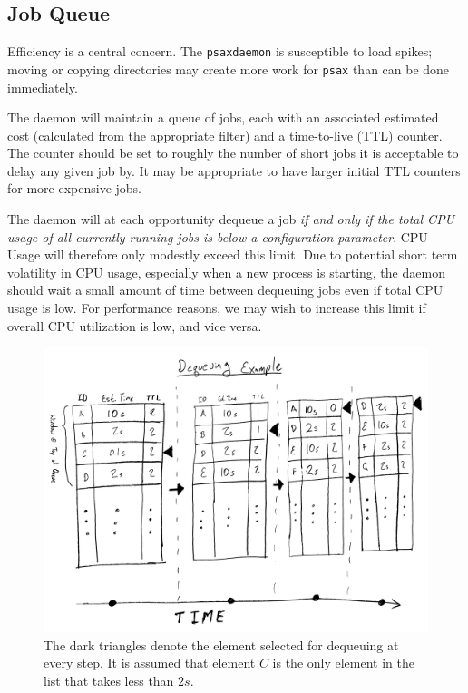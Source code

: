 \documentclass[a4paper]{report}
\newcommand{\inlinecode}{\texttt}
\begin{document}
\subsection{Job Queue}

Efficiency is a central concern. The \inlinecode{psaxdaemon} is susceptible to load spikes; moving or copying directories may create more work for \inlinecode{psax} than can be done immediately.

The daemon will maintain a queue of jobs, each with an associated estimated cost (calculated from the appropriate filter) and a time-to-live (TTL) counter. The counter should be set to roughly the number of short jobs it is acceptable to delay any given job by. It may be appropriate to have larger initial TTL counters for more expensive jobs.

The daemon will at each opportunity dequeue a job \emph{if and only if the total CPU usage of all currently running jobs is below a configuration parameter}. CPU Usage will therefore only modestly exceed this limit. Due to potential short term volatility in CPU usage, especially when a new process is starting, the daemon should wait a small amount of time between dequeuing jobs even if total CPU usage is low. For performance reasons, we may wish to increase this limit if overall CPU utilization is low, and vice versa.

\begin{figure}[h!]
  \centering
  \includegraphics[width=1.0\textwidth]{dequeue}
  \caption{The dark triangles denote the element selected for dequeuing at every step. It is assumed that element $C$ is the only element in the list that takes less than $2s$.}
\end{figure}
\end{document}
